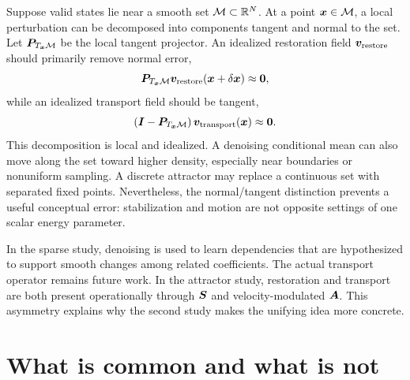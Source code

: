 Suppose valid states lie near a smooth set $\mathcal{M}\subset\mathbb{R}^N$. At a point $\bm{x}\in\mathcal{M}$, a local perturbation can be decomposed into components tangent and normal to the set. Let $\bm{P}_{T_{\bm{x}}\mathcal{M}}$ be the local tangent projector. An idealized restoration field $\bm{v}_{\mathrm{restore}}$ should primarily remove normal error,
\begin{equation}
\bm{P}_{T_{\bm{x}}\mathcal{M}}
\bm{v}_{\mathrm{restore}}(\bm{x}+\delta\bm{x})
\approx \bm{0},
\end{equation}
while an idealized transport field should be tangent,
\begin{equation}
\left(\bm{I}-\bm{P}_{T_{\bm{x}}\mathcal{M}}\right)
\bm{v}_{\mathrm{transport}}(\bm{x})
\approx \bm{0}.
\end{equation}
This decomposition is local and idealized. A denoising conditional mean can also move along the set toward higher density, especially near boundaries or nonuniform sampling. A discrete attractor may replace a continuous set with separated fixed points. Nevertheless, the normal/tangent distinction prevents a useful conceptual error: stabilization and motion are not opposite settings of one scalar energy parameter.

In the sparse study, denoising is used to learn dependencies that are hypothesized to support smooth changes among related coefficients. The actual transport operator remains future work. In the attractor study, restoration and transport are both present operationally through $\bm{S}$ and velocity-modulated $\bm{A}$. This asymmetry explains why the second study makes the unifying idea more concrete.

\section{What is common and what is not}
\label{sec:synthesis-comparison}

